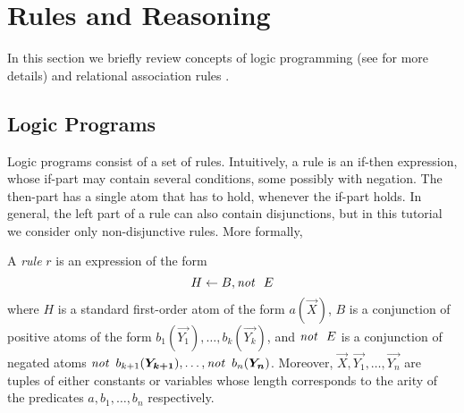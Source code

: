 \section{Rules and Reasoning}
\label{sec:reasoning}
In this section we briefly review concepts of logic programming (see \cite{DBLP:conf/rweb/EiterIK09} for more details) and relational association rules \cite{warmer}.

\subsection{Logic Programs} Logic programs consist of a set of rules. Intuitively, a rule is an if-then expression, whose if-part may contain several conditions, some possibly with
negation. The then-part has a single atom that has to hold, whenever the if-part holds. In general, the left part of a rule can also contain disjunctions, but in this tutorial we consider only non-disjunctive rules. More formally,




\begin{definition}[Rule] A \emph{rule} $r$ is an expression of the form
\begin{equation}
H\leftarrow B, \mathit{not}~ \ E
\end{equation}
where $H$ is a standard first-order atom of the form $a(\vec{X})$, $B$ is a conjunction of positive atoms of the form $b_1(\vec{Y_1}),\dotsc,b_k(\vec{Y_k})$, and $\mathit{not}~ \ E$ %
 is a conjunction of negated atoms $\naf\, b_{k+1}(\vec{Y_{k+1}}),\dotsc,\naf\, b_n(\vec{Y_{n}})$. Moreover,  $\vec{X},\vec{Y_1},\ldots,\vec{Y_{n}}$ are tuples of either constants or variables whose length corresponds to the arity of the predicates $a,b_1,\ldots,b_n$ respectively.
\end{definition}

